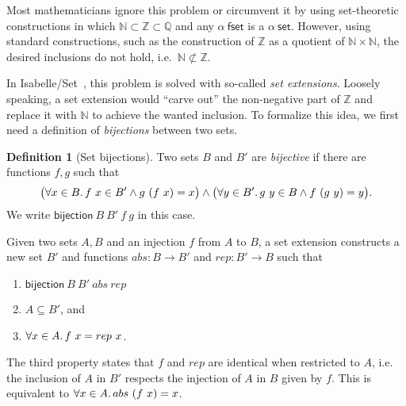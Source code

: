 \documentclass{article}
\newcommand{\kevin}[1]{\textcolor{violet}{\textbf{Kevin}: #1}}
\newcommand{\juli}[1]{\textcolor{orange}{\textbf{Juli}: #1}}
\theoremstyle{definition}
\newtheorem{definition}{Definition}[section]
\newcommand{\eq}{\mathsf{Eq}}
\newcommand{\id}{\mathsf{id}}
\newcommand{\bijection}{\mathsf{bijection}}
\newcommand{\nat}{\mathbb{N}}
\newcommand{\inte}{\mathbb{Z}}
\newcommand{\rat}{\mathbb{Q}}
\begin{document}
Most mathematicians ignore this problem
or circumvent it by using set-theoretic constructions in which
\(\nat \subset \inte \subset \rat\) and any \(\alpha\ \mathsf{fset}\) is a \(\alpha\ \mathsf{set}\).
However, using standard constructions,
such as the construction of \(\inte\) as a quotient of \(\nat \times \nat\),
the desired inclusions do not hold, i.e.\ \(\nat\not\subset\inte\).

In Isabelle/Set~\cite{isabelleset},
this problem is solved with so-called \emph{set extensions}.
Loosely speaking, a set extension would ``carve out''
the non-negative part of $\inte$ and replace it with $\nat$
to achieve the wanted inclusion.
To formalize this idea, we first need a definition of \emph{bijections} between two sets.
\begin{definition}[Set bijections]
  Two sets $B$ and $B'$ are \emph{bijective} if there are functions $f,g$ such that
	\begin{equation*}
    \bigl(\forall x \in B\ldotp f\ x \in B' \land g\ (f\ x) = x\bigr) \land \bigl(\forall y \in B'\ldotp g\ y \in B \land f\ (g\ y) = y\bigr).
  \end{equation*}
  We write $\bijection\ B\ B'\ f\ g$ in this case.
\end{definition}

Given two sets \(A, B\) and an injection \(f\) from \(A\) to \(B\),
a set extension constructs a new set \(B'\) and functions \(abs : B \rightarrow B'\) and \(rep : B' \rightarrow B\) such that
\begin{enumerate}
\item \(\bijection\ B\ B'\ abs\ rep\)
\item \(A \subseteq B'\), and
\item \(\forall x \in A\ldotp f\ x = rep\ x\).
\end{enumerate}
The third property states that \(f\) and \(rep\) are identical when restricted to \(A\),
i.e. the inclusion of \(A\) in \(B'\) respects the injection of \(A\) in \(B\) given by \(f\).
This is equivalent to \(\forall x \in A\ldotp abs\ (f\ x) = x\).
\end{document}
